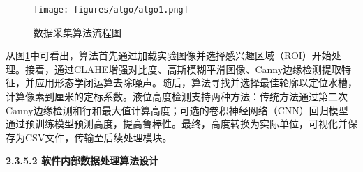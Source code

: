 \begin{figure}[H]
    \centering
    \texttt{[image: figures/algo/algo1.png]}
    \caption{数据采集算法流程图}
    \label{fig:algo1}
\end{figure}

从图\ref{fig:algo1}中可看出，算法首先通过加载实验图像并选择感兴趣区域（ROI）开始处理。接着，通过CLAHE增强对比度、高斯模糊平滑图像、Canny边缘检测提取特征，并应用形态学闭运算去除噪声。随后，算法寻找并选择最佳轮廓以定位水槽，计算像素到厘米的定标系数。液位高度检测支持两种方法：传统方法通过第二次Canny边缘检测和行和最大值计算高度；可选的卷积神经网络（CNN）回归模型通过预训练模型预测高度，提高鲁棒性。最终，高度转换为实际单位，可视化并保存为CSV文件，传输至后续处理模块。

{\noindent \wuhao \rmfamily {} \textbf{2.3.5.2 \quad 软件内部数据处理算法设计}}

